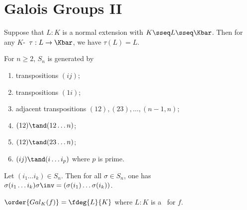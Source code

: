 \documentclass[a4paper]{article}
\begin{document}
\section{Galois Groups II}
\begin{tlemma}
  Suppose that \( L:K \) is a normal extension with \( K\sseq L\sseq \Kbar \).
  Then for any \( K \)-\homo~\( \tau:L\to \Kbar \), we have \( \tau(L) = L \).
\end{tlemma}

\begin{tlemma}
  For \( n\geq 2 \), \( S_n \) is generated by \begin{enumerate}
    \item transpositions \( (ij) \);
    \item transpositions \( (1i) \);
    \item adjacent transpositions \( (12),(23),\ldots,(n-1, n) \);
    \item \( (12)\tand (12\ldots n) \);
    \item \( (12)\tand (23\ldots n) \);
    \item \( (ij)\tand (i\ldots i_p) \) where \( p \) is prime.
  \end{enumerate}
\end{tlemma}

\begin{tlemma}
  Let \( (i_1\ldots i_k)\in S_n \).
  Then for all \( \sigma\in S_n \), one has \( \sigma(i_1\ldots i_k)\sigma\inv = (\sigma(i_1)\ldots\sigma(i_k)) \).
\end{tlemma}

\quad \( \order{Gal_K(f)} = \fdeg{L}{K} \) where \( L:K \) is a \sfe~for \( f \).
\end{document}
